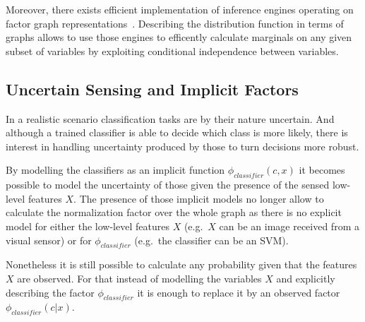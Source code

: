 Moreover, there exists efficient implementation of inference engines operating on factor
graph representations~\cite{Mooij_libDAI_10}.
Describing the distribution function in terms of graphs allows to use those engines to
efficently calculate marginals on any given subset of variables by exploiting conditional
independence between variables.

\subsection{Uncertain Sensing and Implicit Factors}
\label{sec:cues-from-low-level}
In a realistic scenario classification tasks are by their nature uncertain.
And although a trained classifier is able to decide which class is more likely, there is
interest in handling uncertainty produced by those to turn decisions more robust.

By modelling the classifiers as an implicit function $\phi_{classifier}(c, x)$ it becomes
possible to model the uncertainty of those given the presence of the sensed low-level
features $X$. The presence of those implicit models no longer allow to calculate the
normalization factor over the whole graph as there is no explicit model for either the
low\hyp{}level features $X$ (e.g.\ $X$ can be an image received from a visual sensor)
or for $\phi_{classifier}$ (e.g.\ the classifier can be an \gls{SVM}).

Nonetheless it is still possible to calculate any probability given that the features $X$
are observed. For that instead of modelling the variables $X$ and explicitly describing
the factor $\phi_{classifier}$ it is enough to replace it by an observed factor $\phi_{classifier}(c|x)$.


